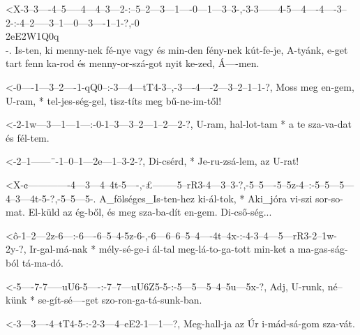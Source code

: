   {<X-3--3----4--5-----4---4--3---2-:--5--2---3---1----0---1---3--3-,-3-3------4-5---4----4----3--2-:-4--2-----3--1---0---3----1--1-?,-0\\2eE2W1Q0q\\-.}
  {   Is-ten, ki menny-nek fé-nye vagy és min-den fény-nek kút-fe-je, A-tyánk, e-get tart fenn ka-rod és menny-or-szá-got nyit ke-zed, Á----men.}

  {<-0----1---3--2----1-qQ0--:-3---4---tT4-3--,-3----4----2---3--2--1--1-?,}
  {  Moss meg en-gem, U-ram, * tel-jes-ség-gel, tisz-títs meg bű-ne-im-től!}

  {<-2-1w---3---1---1---:-0-1--3---3--2---1--2---2-?,}
  {  U-ram, hal-lot-tam * a te sza-va-dat és fél-tem.}

  {<-2--1------¨-1--0--1---2e---1--3-2-?,}
  {  Di-csérd, * Je-ru-zsá-lem, az U-rat!}

  {<X-¢-------------4---3---4--4t-5----,-£--------5--rR3-4---3--3-?,-5--5----5--5z-4--:-5--5---5---4--3---4t-5-?,-5--5---5-.}
  {   A_fölséges_Is-ten-hez ki-ál-tok, * Aki_jóra vi-szi sor-so-mat. El-küld az ég-ből, és meg sza-ba-dít en-gem. Di-cső-ség...}

  {<ô-1--2---2z-6---:-6----6--5--4-5z-6-,-6---6--6--5--4----4t--4x-:-4-3--4---5---rR3-2--1w-2y-?,}
  {   Ir-gal-má-nak * mély-sé-ge-i ál-tal meg-lá-to-ga-tott min-ket  a ma-gas-ság-ból tá-ma-dó.}


  {<-5----7-7-----uU6-5----:-7--7---uU6Z5-5-:-5---5---5--4--5u---5x-?,}
  {  Adj, U-runk, né--künk * se-gít-sé----get szo-ron-ga-tá-sunk-ban.}



  {<-3---3----4--tT4-5-:-2-3---4--eE2-1---1---?,}
  {  Meg-hall-ja az  Úr  i-mád-sá-gom sza-vát.}

